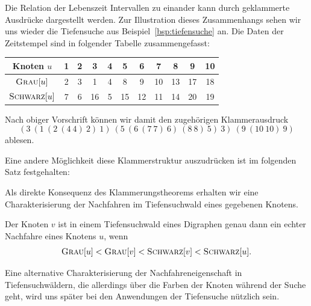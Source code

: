 \begin{bsp} 
	Die Relation der Lebenszeit Intervallen zu einander kann durch geklammerte Ausdrücke dargestellt werden. 
	Zur Illustration dieses Zusammenhangs sehen wir uns wieder die Tiefensuche aus Beispiel~\ref{bsp:tiefensuche} an.
	Die Daten der Zeitstempel sind in folgender Tabelle zusammengefasst:
	\begin{table}[H]
		\centering
		\begin{tabular}{|c|c|c|c|c|c|c|c|c|c|c|}
			\hline
			\textbf{Knoten $u$}        & \textbf{1} & \textbf{2} & \textbf{3} & \textbf{4} & \textbf{5} & \textbf{6} & \textbf{7} & \textbf{8} & \textbf{9} & \textbf{10} \\ \hline
			\textbf{$\mathop{\text{\textsc{Grau}}}[u]$}    & 2          & 3          & 1          & 4          & 8          & 9          & 10         & 13         & 17         & 18          \\ \hline
			\textbf{$\mathop{\text{\textsc{Schwarz}}}[u]$} & 7          & 6          & 16         & 5          & 15         & 12         & 11         & 14         & 20         & 19          \\ \hline
		\end{tabular}
	\end{table}
	Nach obiger Vorschrift können wir damit den zugehörigen Klammerausdruck
	\[
	(3\ (1\ (2\ (4\ 4)\ 2)\ 1)\ (5\ (6\ (7\ 7)\ 6)\ (8\ 8)\ 5)\ 3)\ (9\ (10\ 10)\ 9)
	\]
	ablesen.
	
	Eine andere Möglichkeit diese Klammerstruktur auszudrücken ist im folgenden Satz festgehalten:
\end{bsp} 


\begin{bem}
Als direkte Konsequenz des Klammerungstheorems erhalten wir eine Charakterisierung der Nachfahren im Tiefensuchwald eines gegebenen Knotens.
\end{bem} 

\begin{kor}
\label{cor:nachfahre-tiefenwald}
Der Knoten $v$ ist in einem Tiefensuchwald eines Digraphen genau dann ein echter Nachfahre eines Knotens $u$, wenn
\[
\mathop{\text{\textsc{Grau}}}[u] < \mathop{\text{\textsc{Grau}}}[v] < \mathop{\text{\textsc{Schwarz}}}[v]  < \mathop{\text{\textsc{Schwarz}}}[u].
\]
\end{kor}

\begin{bem} 
Eine alternative Charakterisierung der Nachfahreneigenschaft in Tiefensuchwäldern, die allerdings über die Farben der Knoten während der Suche geht, wird uns später bei den Anwendungen der Tiefensuche nützlich sein. 
\end{bem}



